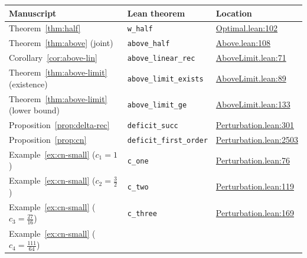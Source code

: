 \documentclass[reqno,final,11pt]{amsart}
\theoremstyle{plain}
\theoremstyle{definition}
\theoremstyle{remark}
\begin{document}
\renewcommand{\arraystretch}{1.15}
\begin{table}[h]
\centering
\begin{tabular}{@{}lll@{}}
\hline
\textbf{Manuscript} & \textbf{Lean theorem} & \textbf{Location} \\
\hline
Theorem~\ref{thm:half} &
  \texttt{w\_half} &
  \href{https://github.com/pfaffelh/coins/blob/c60bcd3/CoinsLean/CoinsLean/Optimal.lean\#L102}{Optimal.lean:102} \\
Theorem~\ref{thm:above} (joint) &
  \texttt{above\_half} &
  \href{https://github.com/pfaffelh/coins/blob/c60bcd3/CoinsLean/CoinsLean/Above.lean\#L108}{Above.lean:108} \\
Corollary~\ref{cor:above-lin} &
  \texttt{above\_linear\_rec} &
  \href{https://github.com/pfaffelh/coins/blob/c60bcd3/CoinsLean/CoinsLean/AboveLimit.lean\#L71}{AboveLimit.lean:71} \\
Theorem~\ref{thm:above-limit} (existence) &
  \texttt{above\_limit\_exists} &
  \href{https://github.com/pfaffelh/coins/blob/c60bcd3/CoinsLean/CoinsLean/AboveLimit.lean\#L89}{AboveLimit.lean:89} \\
Theorem~\ref{thm:above-limit} (lower bound) &
  \texttt{above\_limit\_ge} &
  \href{https://github.com/pfaffelh/coins/blob/c60bcd3/CoinsLean/CoinsLean/AboveLimit.lean\#L133}{AboveLimit.lean:133} \\
Proposition~\ref{prop:delta-rec} &
  \texttt{deficit\_succ} &
  \href{https://github.com/pfaffelh/coins/blob/c60bcd3/CoinsLean/CoinsLean/Perturbation.lean\#L301}{Perturbation.lean:301} \\
Proposition~\ref{prop:cn} &
  \texttt{deficit\_first\_order} &
  \href{https://github.com/pfaffelh/coins/blob/c60bcd3/CoinsLean/CoinsLean/Perturbation.lean\#L2503}{Perturbation.lean:2503} \\
Example~\ref{ex:cn-small} ($c_1=1$) &
  \texttt{c\_one} &
  \href{https://github.com/pfaffelh/coins/blob/c60bcd3/CoinsLean/CoinsLean/Perturbation.lean\#L76}{Perturbation.lean:76} \\
Example~\ref{ex:cn-small} ($c_2=\tfrac{3}{2}$) &
  \texttt{c\_two} &
  \href{https://github.com/pfaffelh/coins/blob/c60bcd3/CoinsLean/CoinsLean/Perturbation.lean\#L119}{Perturbation.lean:119} \\
Example~\ref{ex:cn-small} ($c_3=\tfrac{27}{16}$) &
  \texttt{c\_three} &
  \href{https://github.com/pfaffelh/coins/blob/c60bcd3/CoinsLean/CoinsLean/Perturbation.lean\#L169}{Perturbation.lean:169} \\
Example~\ref{ex:cn-small} ($c_4=\tfrac{111}{64}$) &

\end{tabular}
\end{table}
\end{document}
